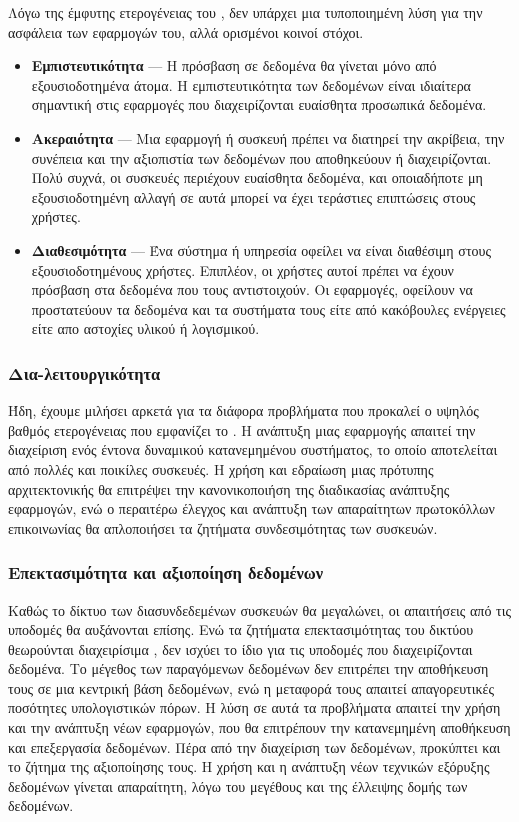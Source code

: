 Λόγω της έμφυτης ετερογένειας του , δεν υπάρχει μια τυποποιημένη λύση για την ασφάλεια των εφαρμογών του, αλλά ορισμένοι κοινοί στόχοι.
\begin{itemize}
    \item \textbf{Εμπιστευτικότητα} --- Η πρόσβαση σε δεδομένα θα γίνεται μόνο από εξουσιοδοτημένα άτομα. Η εμπιστευτικότητα των δεδομένων είναι ιδιαίτερα σημαντική στις εφαρμογές που διαχειρίζονται ευαίσθητα προσωπικά δεδομένα.
    \item \textbf{Ακεραιότητα} --- Μια  εφαρμογή ή συσκευή πρέπει να διατηρεί την ακρίβεια, την συνέπεια και την αξιοπιστία των δεδομένων που αποθηκεύουν ή διαχειρίζονται. Πολύ συχνά, οι  συσκευές περιέχουν ευαίσθητα δεδομένα, και οποιαδήποτε μη εξουσιοδοτημένη αλλαγή σε αυτά μπορεί να έχει τεράστιες επιπτώσεις στους χρήστες.
    \item \textbf{Διαθεσιμότητα} --- Ένα  σύστημα ή υπηρεσία οφείλει να είναι διαθέσιμη στους εξουσιοδοτημένους χρήστες. Επιπλέον, οι χρήστες αυτοί πρέπει να έχουν πρόσβαση στα δεδομένα που τους αντιστοιχούν. Οι  εφαρμογές, οφείλουν να προστατεύουν τα δεδομένα και τα συστήματα τους είτε από κακόβουλες ενέργειες είτε απο αστοχίες υλικού ή λογισμικού.
\end{itemize}
\subsubsection{Δια-λειτουργικότητα}
Ήδη, έχουμε μιλήσει αρκετά για τα διάφορα προβλήματα που προκαλεί ο υψηλός βαθμός ετερογένειας που εμφανίζει το .
Η ανάπτυξη μιας εφαρμογής  απαιτεί την διαχείριση ενός έντονα δυναμικού κατανεμημένου συστήματος, το οποίο αποτελείται από πολλές και ποικίλες συσκευές.
Η χρήση και εδραίωση μιας πρότυπης  αρχιτεκτονικής θα επιτρέψει την κανονικοποιήση της διαδικασίας ανάπτυξης εφαρμογών, ενώ ο περαιτέρω έλεγχος και ανάπτυξη των απαραίτητων πρωτοκόλλων επικοινωνίας θα απλοποιήσει τα ζητήματα συνδεσιμότητας των συσκευών.
\subsubsection{Επεκτασιμότητα και αξιοποίηση δεδομένων}
Καθώς το δίκτυο των διασυνδεδεμένων συσκευών θα μεγαλώνει, οι απαιτήσεις από τις υποδομές θα αυξάνονται επίσης.
Ενώ τα ζητήματα επεκτασιμότητας του δικτύου θεωρούνται διαχειρίσιμα \cite{borgia2014}, δεν ισχύει το ίδιο για τις υποδομές που διαχειρίζονται δεδομένα.
Το μέγεθος των παραγόμενων δεδομένων δεν επιτρέπει την αποθήκευση τους σε μια κεντρική βάση δεδομένων, ενώ η μεταφορά τους απαιτεί απαγορευτικές ποσότητες υπολογιστικών πόρων.
Η λύση σε αυτά τα προβλήματα απαιτεί την χρήση και την ανάπτυξη νέων  εφαρμογών, που θα επιτρέπουν την κατανεμημένη αποθήκευση και επεξεργασία δεδομένων.
Πέρα από την διαχείριση των δεδομένων, προκύπτει και το ζήτημα της αξιοποίησης τους.
Η χρήση και η ανάπτυξη νέων τεχνικών εξόρυξης δεδομένων γίνεται απαραίτητη, λόγω του μεγέθους και της έλλειψης δομής των δεδομένων.
